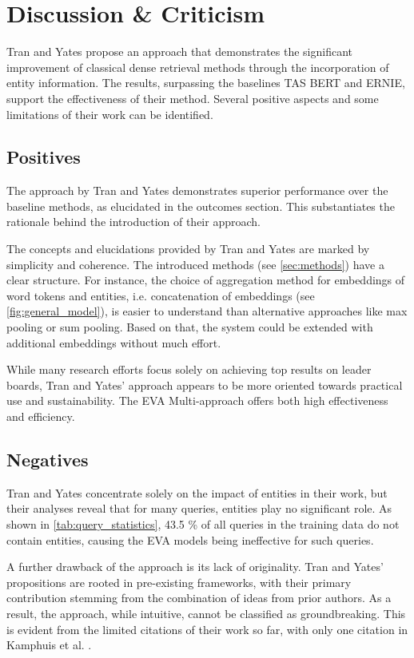 \section{Discussion \& Criticism}\label{sec:discussion}

Tran and Yates propose an approach that demonstrates the significant improvement of classical dense retrieval methods through the incorporation of entity information. The results, surpassing the baselines TAS BERT and ERNIE, support the effectiveness of their method. Several positive aspects and some limitations of their work can be identified.

\subsection{Positives}

The approach by Tran and Yates demonstrates superior performance over the baseline methods, as elucidated in the outcomes section. This substantiates the rationale behind the introduction of their approach.

The concepts and elucidations provided by Tran and Yates are marked by simplicity and coherence. The introduced methods (see \autoref{sec:methods}) have a clear structure. For instance, the choice of aggregation method for embeddings of word tokens and entities, i.e. concatenation of embeddings (see \autoref{fig:general_model}), is easier to understand than alternative approaches like max pooling or sum pooling. Based on that, the system could be extended with additional embeddings without much effort.

While many research efforts focus solely on achieving top results on leader boards, Tran and Yates' approach appears to be more oriented towards practical use and sustainability. The EVA Multi-approach offers both high effectiveness and efficiency.

\subsection{Negatives}

Tran and Yates concentrate solely on the impact of entities in their work, but their analyses reveal that for many queries, entities play no significant role. As shown in \autoref{tab:query_statistics}, 43.5 \% of all queries in the training data do not contain entities, causing the EVA models being ineffective for such queries.

A further drawback of the approach is its lack of originality. Tran and Yates' propositions are rooted in pre-existing frameworks, with their primary contribution stemming from the combination of ideas from prior authors. As a result, the approach, while intuitive, cannot be classified as groundbreaking. This is evident from the limited citations of their work so far, with only one citation in Kamphuis et al. \cite{kamphuis2023mmead}.

